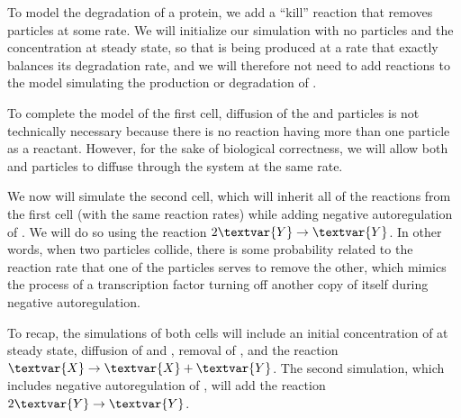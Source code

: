 To model the degradation of a protein, we add a ``kill'' reaction that removes  particles at some rate. We will initialize our simulation with no  particles and the  concentration at steady state, so that  is being produced at a rate that exactly balances its degradation rate, and we will therefore not need to add reactions to the model simulating the production or degradation of .

To complete the model of the first cell, diffusion of the  and  particles is not technically necessary because there is no reaction having more than one particle as a reactant. However, for the sake of biological correctness, we will allow both  and  particles to diffuse through the system at the same rate.\\

\begin{qbox}\end{qbox} 

We now will simulate the second cell, which will inherit all of the reactions from the first cell (with the same reaction rates) while adding negative autoregulation of . We will do so using the reaction $2\textvar{Y} \rightarrow \textvar{Y}$. In other words, when two  particles collide, there is some probability related to the reaction rate that one of the particles serves to remove the other, which mimics the process of a transcription factor turning off another copy of itself during negative autoregulation.

To recap, the simulations of both cells will include an initial concentration of  at steady state, diffusion of  and , removal of , and the reaction $\textvar{X} \rightarrow \textvar{X} + \textvar{Y}$. The second simulation, which includes negative autoregulation of , will add the reaction $2\textvar{Y} \rightarrow \textvar{Y}$. \\

\begin{note}\end{note} 

